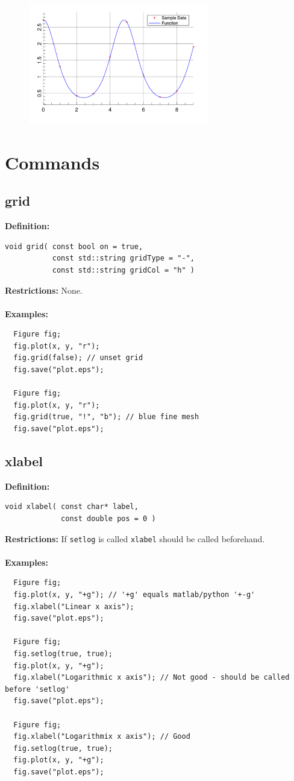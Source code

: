 \documentclass[a4paper]{article}
\newcommand{\command}[1]{\subsection{#1}}
\begin{document}
\begin{figure}[h]
  \centering
  \includegraphics[width=0.7\textwidth]{opening-example.pdf}
  \thispagestyle{empty}
\end{figure}

\restoregeometry
\newpage
\section{Commands}

\command{grid}

\textbf{Definition:}
\begin{lstlisting}
void grid( const bool on = true, 
           const std::string gridType = "-", 
           const std::string gridCol = "h" )
\end{lstlisting}
%
\textbf{Restrictions:} None. \\ \\
%
\textbf{Examples:}
\begin{lstlisting}
  Figure fig;
  fig.plot(x, y, "r");
  fig.grid(false); // unset grid
  fig.save("plot.eps");

  Figure fig;
  fig.plot(x, y, "r");
  fig.grid(true, "!", "b"); // blue fine mesh
  fig.save("plot.eps");
\end{lstlisting}

\command{xlabel}

\textbf{Definition:}
\begin{lstlisting}
void xlabel( const char* label, 
             const double pos = 0 )
\end{lstlisting}
%
\textbf{Restrictions:} If \texttt{setlog} is called \texttt{xlabel} should be called beforehand. \\ \\
%
\textbf{Examples:}
\begin{lstlisting}
  Figure fig;
  fig.plot(x, y, "+g"); // '+g' equals matlab/python '+-g'
  fig.xlabel("Linear x axis");
  fig.save("plot.eps");

  Figure fig;
  fig.setlog(true, true);
  fig.plot(x, y, "+g");
  fig.xlabel("Logarithmic x axis"); // Not good - should be called before 'setlog'
  fig.save("plot.eps");

  Figure fig;
  fig.xlabel("Logarithmix x axis"); // Good
  fig.setlog(true, true);
  fig.plot(x, y, "+g");
  fig.save("plot.eps");
\end{lstlisting}
\end{document}
